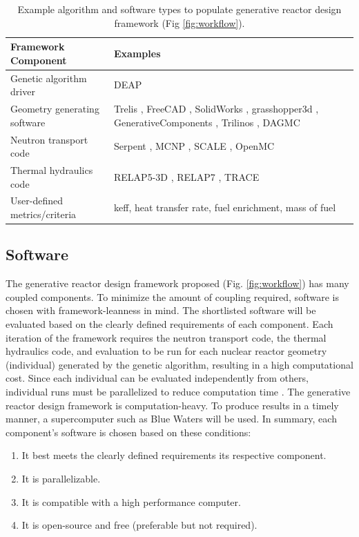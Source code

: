\begin{table}[!htbp]
        \caption{Example algorithm and software types to populate generative reactor 
        design framework (Fig \ref{fig:workflow}).}
        \label{tab:examples}
        \centering
        \doublespacing
        \small
        \begin{tabular}{lp{10cm}}
        \hline
        \textbf{Framework Component} & \textbf{Examples}\\ \hline
        Genetic algorithm driver & DEAP \cite{fortin_deap_2012} \\
        Geometry generating software & Trelis \cite{noauthor_trelis_2018}, FreeCAD \cite{falck_freecad_2012}, SolidWorks \cite{lombard_solidworks_2008}, grasshopper3d \cite{rutten_grasshopper3d_2015}, GenerativeComponents \cite{aish_bentleys_2003}, Trilinos \cite{heroux_overview_2003}, DAGMC \cite{smith_enhanced_2011} \\
        Neutron transport code & Serpent \cite{leppanen_serpent_2014}, MCNP \cite{werner_mcnp6._2018}, SCALE \cite{bucholz_scale:_1982}, OpenMC \cite{romano_openmc_2013} \\ 
        Thermal hydraulics code & RELAP5-3D \cite{strydom_comparison_2016}, RELAP7 \cite{andrs_relap-7_2012}, TRACE \cite{xu_multi-physics_2006}\\
        User-defined metrics/criteria & keff, heat transfer rate, fuel enrichment, mass of fuel \\ \hline
\end{tabular}
\end{table}

\subsection{Software}
The generative reactor design framework proposed (Fig. \ref{fig:workflow}) 
has many coupled components. 
To minimize the amount of coupling required, software is chosen with 
framework-leanness in mind. 
The shortlisted software will be evaluated based on the clearly 
defined requirements of each component. 
Each iteration of the framework requires the neutron transport code, 
the thermal hydraulics code, and evaluation to be run for each 
nuclear reactor geometry (individual) generated by the genetic algorithm, 
resulting in a high computational cost. 
Since each individual can be evaluated independently from others, 
individual runs must be parallelized to reduce computation time 
\cite{pereira_genetic_2000}. 
The generative reactor design framework is computation-heavy. 
To produce results in a timely manner, a supercomputer 
such as Blue Waters \cite{ncsa_about_2017} will be used. 
In summary, each component's software is chosen based on these 
conditions: 
\begin{enumerate}
    \item It best meets the clearly defined requirements 
    its respective component. 
    \item It is parallelizable. 
    \item It is compatible with a high performance computer. 
    \item It is open-source and free (preferable but not required). 
\end{enumerate}

